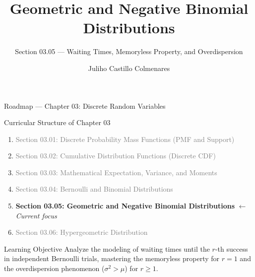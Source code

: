 \documentclass[aspectratio=169,xcolor={dvipsnames,table}]{beamer}
\title{Geometric and Negative Binomial Distributions}
\subtitle{Section 03.05 --- Waiting Times, Memoryless Property, and Overdispersion}
\author[J. Castillo Colmenares]{Juliho Castillo Colmenares}
\institute[Tec de Monterrey]{Tecnológico de Monterrey}
\date{\vspace{-1.2cm}}
\begin{document}
\begin{frame}[plain]
	\titlepage
\end{frame}

\begin{frame}{Roadmap --- Chapter 03: Discrete Random Variables}
	\begin{block}{Curricular Structure of Chapter 03}
		\small
		\begin{enumerate}
			\itemsep=0.04cm
			\item \textcolor{gray}{Section 03.01: Discrete Probability Mass Functions (PMF and Support)}
			\item \textcolor{gray}{Section 03.02: Cumulative Distribution Functions (Discrete CDF)}
			\item \textcolor{gray}{Section 03.03: Mathematical Expectation, Variance, and Moments}
			\item \textcolor{gray}{Section 03.04: Bernoulli and Binomial Distributions}
			\item \textbf{\textcolor{TecRojo}{Section 03.05: Geometric and Negative Binomial Distributions}} $\leftarrow$ \emph{Current focus}
			\item \textcolor{gray}{Section 03.06: Hypergeometric Distribution}
		\end{enumerate}
	\end{block}
	\vspace{-0.15cm}
	\begin{alertblock}{Learning Objective}
		\footnotesize
		Analyze the modeling of waiting times until the $r$-th success in independent Bernoulli trials, mastering the memoryless property for $r=1$ and the overdispersion phenomenon ($\sigma^2 > \mu$) for $r \ge 1$.
	\end{alertblock}
\end{frame}
\end{document}
